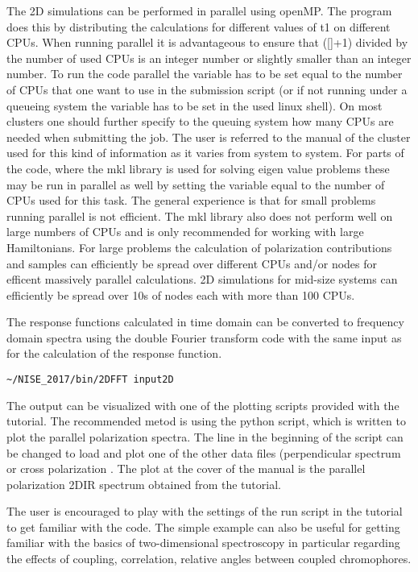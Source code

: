The 2D simulations can be performed in parallel using openMP. The program does this by distributing the calculations for different values of t1 on different CPUs. When running parallel it is advantageous to ensure that ([]+1) divided by the number of used CPUs is an integer number or slightly smaller than an integer number. To run the code parallel the  variable has to be set equal to the number of CPUs that one want to use in the submission script (or if not running under a queueing system the variable has to be set in the used linux shell). On most clusters one should further specify to the queuing system how many CPUs are needed when submitting the job. The user is referred to the manual of the cluster used for this kind of information as it varies from system to system. For parts of the code, where the mkl library is used for solving eigen value problems these may be run in parallel as well by setting the  variable equal to the number of CPUs used for this task. The general experience is that for small problems running parallel is not efficient. The mkl library also does not perform well on large numbers of CPUs and is only recommended for working with large Hamiltonians.  For large problems the calculation of polarization contributions and samples can efficiently be spread over different CPUs and/or nodes for efficent massively parallel calculations. 2D simulations for mid-size systems can efficiently be spread over 10s of nodes each with more than 100 CPUs.

The response functions calculated in time domain can be converted to frequency domain spectra using the double Fourier transform code with the same input as for the calculation of the response function.
\begin{lstlisting}[style=mystyle]
~/NISE_2017/bin/2DFFT input2D
\end{lstlisting}
The output can be visualized with one of the plotting scripts provided with the tutorial. The recommended metod is using the  python script, which is written to plot the parallel polarization spectra. The line  in the beginning of the script can be changed to load and plot one of the other data files (perpendicular spectrum  or cross polarization . The plot at the cover of the manual is the parallel polarization 2DIR spectrum obtained from the tutorial.

The user is encouraged to play with the settings of the run script in the tutorial to get familiar with the code.
The simple example can also be useful for getting familiar with the basics of two-dimensional spectroscopy in particular regarding the effects of coupling, correlation, relative angles between
coupled chromophores.

